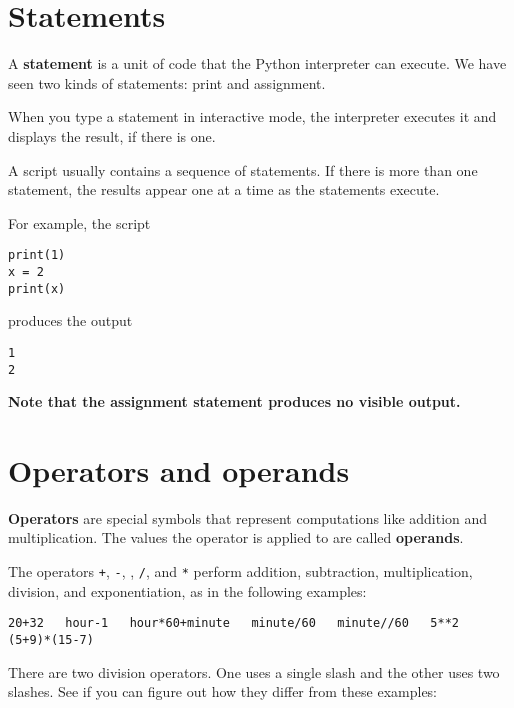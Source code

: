 \section{Statements}

A {\bf statement} is a unit of code that the Python interpreter can
execute.  We have seen two kinds of statements: print
and assignment.


When you type a statement in interactive mode, the interpreter
executes it and displays the result, if there is one.

A script usually contains a sequence of statements.  If there
is more than one statement, the results appear one at a time
as the statements execute.

For example, the script

\beforeverb
\begin{verbatim}
print(1)
x = 2
print(x)
\end{verbatim}
\afterverb
%
produces the output

\beforeverb
\begin{verbatim}
1
2
\end{verbatim}
\afterverb
%
{\bf Note that the assignment statement produces no visible output.}


\section{Operators and operands}

{\bf Operators} are special symbols that represent computations like
addition and multiplication.  The values the operator is applied to
are called {\bf operands}.

The operators {\tt +}, {\tt -}, {\tt *}, {\tt /}, and {\tt **}
perform addition, subtraction, multiplication, division, and
exponentiation, as in the following examples:

\beforeverb
\begin{verbatim}
20+32   hour-1   hour*60+minute   minute/60   minute//60   5**2   (5+9)*(15-7)
\end{verbatim}
\afterverb
%
There are two division operators. One uses a single slash and the other uses two slashes. See if you can figure out how they differ from these examples:

